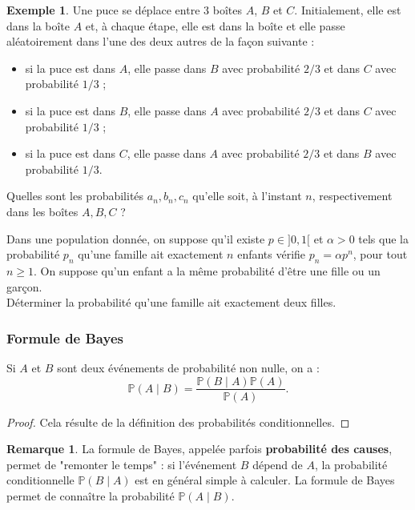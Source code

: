 \documentclass[french]{article}
\renewcommand{\P}{\mathbb{P}}
\theoremstyle{plain}
\theoremstyle{definition}
\newtheorem*{ex}{Exemple}
\newtheorem*{rmq}{Remarque}
\theoremstyle{remark}
\begin{document}
\begin{ex}
	Une puce se déplace entre $3$ boîtes $A$, $B$ et $C$. Initialement, elle est dans la boîte $A$ et, à chaque étape, elle est dans la boîte et elle passe aléatoirement dans l'une des deux autres de la façon suivante :
	\begin{itemize}
		\item si la puce est dans $A$, elle passe dans $B$ avec probabilité $2/3$ et dans $C$ avec probabilité $1/3$ ;
		\item si la puce est dans $B$, elle passe dans $A$ avec probabilité $2/3$ et dans $C$ avec probabilité $1/3$ ;
		\item si la puce est dans $C$, elle passe dans $A$ avec probabilité $2/3$ et dans $B$ avec probabilité $1/3$.
	\end{itemize}
	Quelles sont les probabilités $a_n,b_n,c_n$ qu'elle soit, à l'instant $n$, respectivement dans les boîtes $A,B,C$ ?
\end{ex}

\begin{exo}
	Dans une population donnée, on suppose qu'il existe $p\in]0,1[$ et $\alpha>0$ tels que la probabilité $p_n$ qu'une famille ait exactement $n$ enfants vérifie $p_n=\alpha p^n$, pour tout $n\geqslant 1$. On suppose qu'un enfant a la même probabilité d'être une fille ou un garçon.\\
	Déterminer la probabilité qu'une famille ait exactement deux filles.
\end{exo}

\subsubsection*{Formule de Bayes}

\begin{thm}%
	Si $A$ et $B$ sont deux événements de probabilité non nulle, on a :
	$$\P(A\mid B)=\frac{\P(B\mid A)\P(A)}{\P(A)}.$$
\end{thm}
\begin{proof}
	Cela résulte de la définition des probabilités conditionnelles.
\end{proof}

\begin{rmq}
	La formule de Bayes, appelée parfois \textbf{probabilité des causes}, permet de "remonter le temps" : si l'événement $B$ dépend de $A$, la probabilité conditionnelle $\P(B\mid A)$ est en général simple à calculer. La formule de Bayes permet de connaître la probabilité $\P(A\mid B)$.
\end{rmq}
\end{document}
